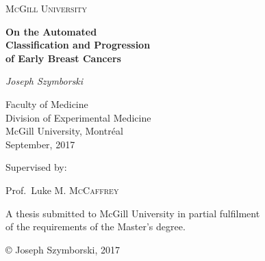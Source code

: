 \begin{titlepage}
	\centering
	\vspace{1cm}
	{\scshape\Large McGill University\par}
	\vspace{1.5cm}
	{\huge\bfseries On the Automated\\Classification and Progression\\of Early Breast Cancers\par}
	\vspace{2cm}
	{\Large\itshape Joseph Szymborski\par}
	\vspace{1cm}
	{\large Faculty of Medicine\\
		Division of Experimental Medicine\\
		McGill University, Montréal\\
		September, 2017\par}
	\vspace{1.5cm}
	Supervised by:\par
	Prof.~Luke M. \textsc{McCaffrey}
	
	\vfill
	{A thesis submitted to McGill University in partial fulfilment\\of the requirements of the Master's degree.\par}
	\vfill

	{© Joseph Szymborski, 2017\par}
\end{titlepage}
